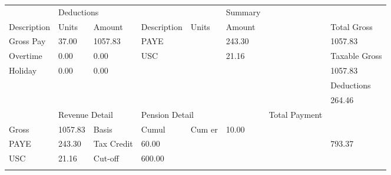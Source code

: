 \documentclass{article}
\begin{document}
\begin{table}[h]
    \begin{tabular}{|llllll|l|l|}
        \hhline{|---|---|~|-|}
        \multicolumn{3}{|l|}{Payments}                                                           & \multicolumn{3}{l|}{Deductions}                                   &  & Summary       \\ \hhline{|~~~|~~~|~|-|}
        Description & Units                            & \multicolumn{1}{l|}{Amount}             & Description                 & Units            & Amount           &  & \cellcolor{Gray} Total Gross   \\ \hhline{|---|---|~|-|}
        Gross Pay   & 37.00                   & \multicolumn{1}{l|}{1057.83} & PAYE                        &                  & 243.30           &  & 1057.83   \\ \hhline{|~~~|~~~|~|-|}
        Overtime    & 0.00                       & \multicolumn{1}{l|}{0.00}     & USC                         &                  & 21.16            &  & \cellcolor{Gray} Taxable Gross \\ \hhline{|~~~|~~~|~|-|}
        Holiday     & 0.00                        & \multicolumn{1}{l|}{0.00}      &                             &                  &                  &  & 1057.83   \\ \hhline{|~~~|~~~|~|-|}
                    &                                  & \multicolumn{1}{l|}{}                   &                             &                  &                  &  & \cellcolor{Gray} Deductions    \\ \hhline{|~~~|~~~|~|-|}
                    &                                  & \multicolumn{1}{l|}{}                   &                             &                  &                  &  & 264.46   \\ \hhline{|---|---|~|-|}
        \multicolumn{2}{|l|}{Cumulative}               & \multicolumn{2}{l|}{Revenue Detail}                                   & \multicolumn{2}{l|}{Pension Detail} &  & \cellcolor{Gray} Total Payment \\ \hhline{|---|---|~|-|}
        Gross       & \multicolumn{1}{l|}{1057.83} & Basis                                   & \multicolumn{1}{l|}{Cumul}  & Cum er           & 10.00            &  & \\
        PAYE        & \multicolumn{1}{l|}{243.30}      & Tax Credit                              & \multicolumn{1}{l|}{60.00}  &                  &                  &  & 793.37     \\
        USC         & \multicolumn{1}{l|}{21.16}       & Cut-off                                 & \multicolumn{1}{l|}{600.00} &                  &                  &  & \\ \hhline{|---|---|~|-|}
    \end{tabular}
\end{table}
\end{document}
